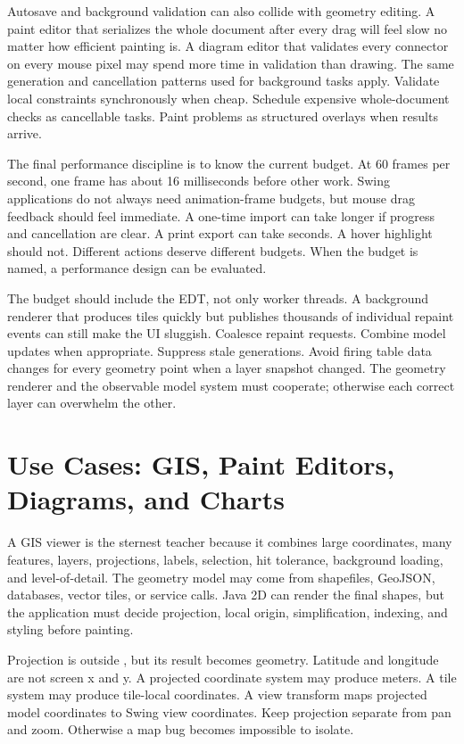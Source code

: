 Autosave and background validation can also collide with geometry editing. A paint editor that serializes the whole document after every drag will feel slow no matter how efficient  painting is. A diagram editor that validates every connector on every mouse pixel may spend more time in validation than drawing. The same generation and cancellation patterns used for background tasks apply. Validate local constraints synchronously when cheap. Schedule expensive whole-document checks as cancellable tasks. Paint problems as structured overlays when results arrive.

The final performance discipline is to know the current budget. At 60 frames per second, one frame has about 16 milliseconds before other work. Swing applications do not always need animation-frame budgets, but mouse drag feedback should feel immediate. A one-time import can take longer if progress and cancellation are clear. A print export can take seconds. A hover highlight should not. Different actions deserve different budgets. When the budget is named, a performance design can be evaluated.

The budget should include the EDT, not only worker threads. A background renderer that produces tiles quickly but publishes thousands of individual repaint events can still make the UI sluggish. Coalesce repaint requests. Combine model updates when appropriate. Suppress stale generations. Avoid firing table data changes for every geometry point when a layer snapshot changed. The geometry renderer and the observable model system must cooperate; otherwise each correct layer can overwhelm the other.

\section{Use Cases: GIS, Paint Editors, Diagrams, and Charts}

A GIS viewer is the sternest teacher because it combines large coordinates, many features, layers, projections, labels, selection, hit tolerance, background loading, and level-of-detail. The geometry model may come from shapefiles, GeoJSON, databases, vector tiles, or service calls. Java 2D can render the final shapes, but the application must decide projection, local origin, simplification, indexing, and styling before painting.

Projection is outside , but its result becomes geometry. Latitude and longitude are not screen x and y. A projected coordinate system may produce meters. A tile system may produce tile-local coordinates. A view transform maps projected model coordinates to Swing view coordinates. Keep projection separate from pan and zoom. Otherwise a map bug becomes impossible to isolate.

